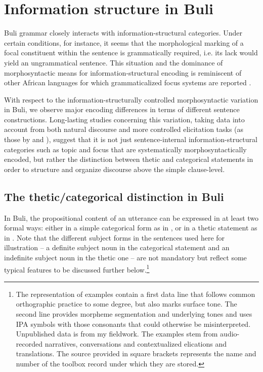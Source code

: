 \documentclass[output=paper]{langsci/langscibook}
\begin{document}
\section{ Information structure in Buli}

Buli grammar closely interacts with information-structural categories. Under certain conditions, for instance, it seems that the morphological marking of a focal constituent within the sentence is grammatically required, i.e. its lack would yield an ungrammatical sentence. This situation and the dominance of morphosyntactic means for information-structural encoding is reminiscent of other African languages for which grammaticalized focus systems are reported \citep{HymanWatters1984,Robert2000,Wolff2005}. 

With respect to the information-structurally controlled morphosyntactic variation in Buli, we observe major encoding differences in terms of different sentence constructions. Long-lasting studies concerning this variation, taking data into account from both natural discourse and more controlled elicitation tasks (as those by \citealt{SkopeteasEtAl2006} and \citealt{Schwarz2007}), suggest that it is not just sentence-internal information-structural categories such as topic and focus that are systematically morphosyntactically encoded, but rather the distinction between thetic and categorical statements in order to structure and organize discourse above the simple clause-level. 

\subsection{The thetic/categorical distinction in Buli}

In Buli, the propositional content of an utterance can be expressed in at least two formal ways: either in a simple categorical form as in , or in a thetic statement as in . Note that the different subject forms in the sentences used here for illustration – a definite subject noun in the categorical statement and an indefinite subject noun in the thetic one – are not mandatory but reflect some typical features to be discussed further below.\footnote{ The representation of examples contain a first data line that follows common orthographic practice to some degree, but also marks surface tone. The second line provides morpheme segmentation and underlying tones and uses IPA symbols with those consonants that could otherwise be misinterpreted. Unpublished data is from my fieldwork. The examples stem from audio-recorded narratives, conversations and contextualized elications and translations. The source provided in square brackets represents the name and number of the toolbox record under which they are stored.} 
 
\end{document}
